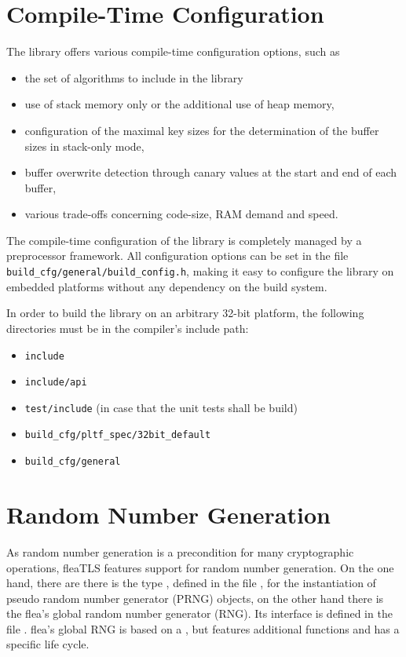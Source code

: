 \documentclass[a4paper,11pt]{scrartcl}
\begin{document}
  \section{Compile-Time Configuration}

The library offers various compile-time
configuration options, such as 
\begin{itemize}
  \item the set of algorithms to include in the library
  \item use of stack memory only or the additional use of heap memory,
  \item configuration of the maximal key sizes for the determination of the
    buffer sizes in stack-only mode,
  \item buffer overwrite detection through canary values at the start and end of
    each buffer,
  \item various trade-offs concerning code-size, RAM demand and speed.
  \end{itemize}

  The compile-time configuration of the library is completely managed by a
  preprocessor framework. All configuration options can be set in the file
  \verb#build_cfg/general/build_config.h#, making it easy to configure the
  library on embedded platforms without any dependency on the build system.

  In order to build the library on an arbitrary 32-bit platform, the following
  directories must be in the compiler's include path:
  \begin{itemize}
    \item \verb#include#
    \item \verb#include/api#
    \item \verb#test/include# (in case that the unit tests shall be build)
    \item \verb#build_cfg/pltf_spec/32bit_default#
    \item \verb#build_cfg/general#
  \end{itemize}

\section{Random Number Generation }
\label{secRng}

As random number generation is a precondition for many cryptographic operations,
fleaTLS features support for random number generation. On the one hand, there
are there is the type , defined in the file
, for the instantiation of
pseudo random number generator (PRNG) objects, on the other hand there is the flea's
global random number generator (RNG). Its interface is defined in the file
. flea's global RNG is based on a
, but features additional functions and has a
specific life cycle.
\end{document}
